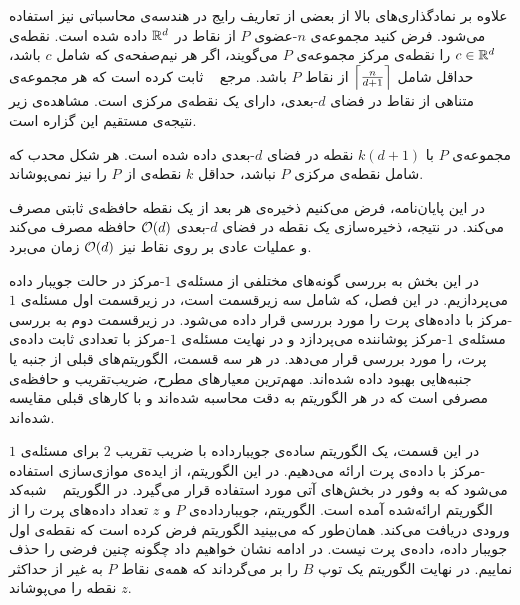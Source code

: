  

علاوه بر نمادگذاری‌های بالا از بعضی از تعاریف رایج در هندسه‌ی محاسباتی نیز‌ استفاده می‌شود. فرض کنید مجموعه‌ی $n$-عضوی $P$ از نقاط در $\mathbb{R}^d$ داده شده است. نقطه‌ی $c \in \mathbb{R}^d$ را نقطه‌ی مرکز مجموعه‌ی $P$ می‌گویند، اگر هر نیم‌صفحه‌ی که شامل $c$ باشد، حداقل شامل $\left\lceil{\frac{n}{d+1}}\right\rceil$ از نقاط $P$ باشد. مرجع ~ ثابت کرده است که هر مجموعه‌ی متناهی از نقاط در فضای $d$-بعدی، دارای یک نقطه‌ی مرکزی است. مشاهده‌ی زیر نتیجه‌ی مستقیم این گزاره است.


مجموعه‌ی $P$ با $k(d+1)$ نقطه در فضای $d$-بعدی داده شده است. هر شکل محدب که شامل نقطه‌ی مرکزی $P$ نباشد، حداقل $k$ نقطه‌ی از $P$ را نیز نمی‌پوشاند.


در این پایان‌نامه، فرض می‌کنیم ذخیره‌ی هر بعد از یک نقطه‌ حافظه‌ی ثابتی مصرف می‌کند. در نتیجه، ذخیره‌سازی یک نقطه در فضای $d$-بعدی $\mathcal{O}(d)$ حافظه مصرف می‌کند و عملیات عادی بر روی نقاط نیز‌ $\mathcal{O}(d)$ زمان می‌برد.


در این بخش به بررسی گونه‌های مختلفی از مسئله‌ی $1$-مرکز در حالت جویبار داده می‌پردازیم. در این فصل، که شامل سه زیرقسمت است، در زیرقسمت اول مسئله‌ی $1$-مرکز با داده‌های پرت را مورد بررسی قرار داده می‌شود. در زیرقسمت دوم به بررسی مسئله‌ی $1$-مرکز پوشاننده می‌پردازد و در نهایت مسئله‌ی $1$-مرکز با تعدادی ثابت داده‌ی پرت، را مورد بررسی قرار می‌دهد. در هر سه قسمت‌، الگوریتم‌های قبلی از جنبه‌ یا جنبه‌هایی بهبود داده شده‌اند. مهم‌ترین معیار‌های مطرح، ضریب‌تقریب و حافظه‌ی مصرفی است که در هر الگوریتم به دقت محاسبه شده‌اند و با کارهای قبلی مقایسه شده‌اند.



در این قسمت، یک الگوریتم ساده‌ی جویبارداده با ضریب تقریب $2$ برای مسئله‌ی $1$-مرکز با داده‌ی پرت ارائه می‌دهیم. در این الگوریتم، از ایده‌ی موازی‌سازی استفاده می‌شود که به وفور در بخش‌های آتی مورد استفاده قرار می‌گیرد. در الگوریتم ~ شبه‌کد الگوریتم ارائه‌شده آمده است. الگوریتم، جویبارداده‌ی $P$ و $z$ تعداد داده‌های پرت را از ورودی دریافت می‌کند. همان‌طور که می‌بینید الگوریتم فرض کرده است که نقطه‌ی اول جویبار داده، داده‌ی پرت نیست. در ادامه نشان خواهیم داد چگونه چنین فرضی را حذف نماییم. در نهایت الگوریتم یک توپ $B$ را بر می‌گرداند که همه‌ی نقاط $P$ به غیر از حداکثر $z$ نقطه را می‌پوشاند.

